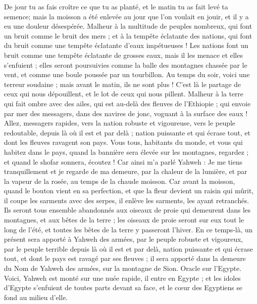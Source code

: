 \begin{multicols}{2}
De jour tu as fais croître ce que tu as planté, et le matin tu as fait levé ta semence; mais la moisson a été enlevée au jour que l'on voulait en jouir, et il y a eu une douleur désespérée.
Malheur à la multitude de peuples nombreux, qui font un bruit comme le bruit des mers ; et à la tempête éclatante des nations, qui font du bruit comme une tempête éclatante d'eaux impétueuses !
Les nations font un bruit comme une tempête éclatante de grosses eaux, mais il les menace et elles s'enfuient ; elles seront poursuivies comme la balle des montagnes chassée par le vent, et comme une boule poussée par un tourbillon.
Au temps du soir, voici une terreur soudaine ; mais avant le matin, ils ne sont plus ! C'est là le partage de ceux qui nous dépouillent, et le lot de ceux qui nous pillent.
\VerseOne{}Malheur à la terre qui fait ombre avec des ailes, qui est au-delà des fleuves de l'Ethiopie ;
qui envoie par mer des messagers, dans des navires de jonc, voguant à la surface des eaux ! Allez, messagers rapides, vers la nation robuste et vigoureuse, vers le peuple redoutable, depuis là où il est et par delà ; nation puissante et qui écrase tout, et dont les fleuves ravagent son pays.
Vous tous, habitants du monde, et vous qui habitez dans le pays, quand la bannière sera élevée sur les montagnes, regardez ; et quand le shofar sonnera, écoutez !
Car ainsi m'a parlé Yahweh : Je me tiens tranquillement et je regarde de ma demeure, par la chaleur de la lumière, et par la vapeur de la rosée, au temps de la chaude moisson.
Car avant la moisson, quand le bouton vient en sa perfection, et que la fleur devient un raisin qui mûrit, il coupe les sarments avec des serpes, il enlève les sarments, les ayant retranchés.
Ils seront tous ensemble abandonnés aux oiseaux de proie qui demeurent dans les montagnes, et aux bêtes de la terre ; les oiseaux de proie seront sur eux tout le long de l'été, et toutes les bêtes de la terre y passeront l'hiver.
En ce temps-là, un présent sera apporté à Yahweh des armées, par le peuple robuste et vigoureux, par le peuple terrible depuis là où il est et par delà, nation puissante et qui écrase tout, et dont le pays est ravagé par ses fleuves ; il sera apporté dans la demeure du Nom de Yahweh des armées, sur la montagne de Sion.
\VerseOne{}Oracle sur l'Egypte. Voici, Yahweh est monté sur une nuée rapide, il entre en Egypte ; et les idoles d'Egypte s'enfuient de toutes parts devant sa face, et le cœur des Egyptiens se fond au milieu d'elle.

\end{multicols}
